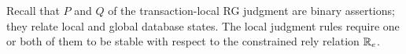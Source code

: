




Recall that $P$ and $Q$ of the transaction-local RG judgment are
binary assertions; they relate local and global database states. The
local judgment rules require one or both of them to be stable with
respect to the constrained rely relation $\mathbb{R}_e$.

